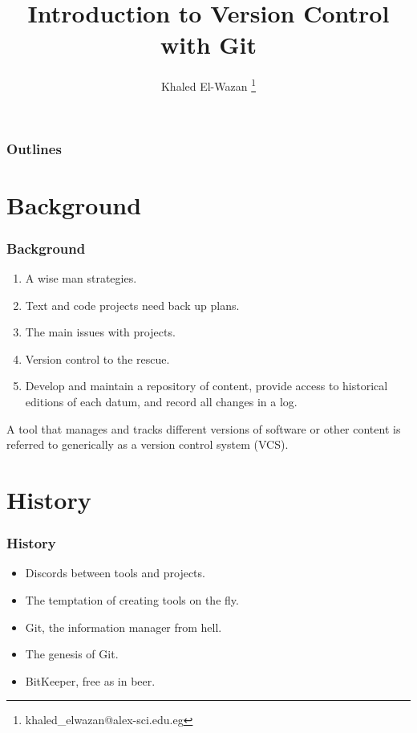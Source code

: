 \documentclass[22pt]{beamer}
\title{Introduction to Version Control with Git \cite{loeliger2012version}}
\author{Khaled El-Wazan \thanks{khaled\_elwazan@alex-sci.edu.eg}}
\institute{Department of Mathematics and Computer Science, Faculty of Science, Alexandria University}
\date{}
\begin{document}
\Large
\maketitle


\begin{frame}
    \frametitle{Outlines}
    \tableofcontents
\end{frame}


\section{Background}

\begin{frame}[allowframebreaks]
    \frametitle{Background}
    \begin{enumerate}
        \item A wise man strategies.
        \item Text and code projects need back up plans.
        \item The main issues with projects.
        \item Version control to the rescue.


        \item Develop and maintain a repository of content, provide access to historical editions
              of each datum, and record all changes in a log.
    \end{enumerate}
    \begin{definition}
        A tool that manages and tracks different versions of software or other content is referred
        to generically as a version control system (VCS).
    \end{definition}

\end{frame}


\section{History}
\begin{frame}
    \frametitle{History}
    \begin{itemize}
        \item Discords between tools and projects.
        \item The temptation of creating tools on the fly.
        \item Git, the information manager from hell.
        \item The genesis of Git.
        \item BitKeeper, free as in beer.
    \end{itemize}


\end{frame}
\end{document}
